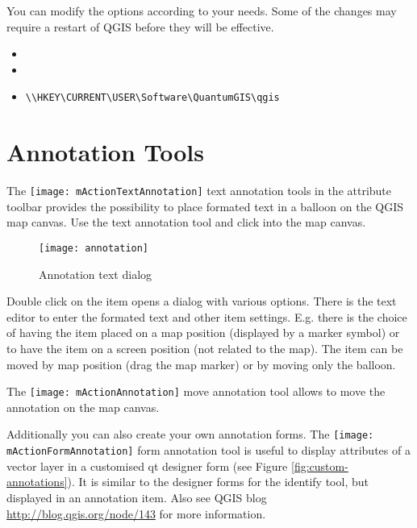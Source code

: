 You can modify the options according to your needs. Some of the changes may 
require a restart of QGIS before they will be effective.

\begin{itemize}
\item {}
\item {}
\item {}
\begin{verbatim}
\\HKEY\CURRENT\USER\Software\QuantumGIS\qgis
\end{verbatim}
\end{itemize}

\section{Annotation Tools}\label{sec:annotations}

The \texttt{[image: mActionTextAnnotation]} text 
annotation tools in the attribute toolbar provides the possibility to 
place formated text in a balloon on the QGIS map canvas. Use the text 
annotation tool and click into the map canvas. 

\begin{figure}[ht]
   \centering
   \texttt{[image: annotation]}
   \caption{Annotation text dialog \nixcaption}
   \label{fig:annotation}
\end{figure}

Double click on the item opens a dialog with various options. There is the 
text editor to enter the formated text and other item settings. E.g. there 
is the choice of having the item placed on a map position (displayed by 
a marker symbol) or to have the item on a screen position (not related 
to the map). The item can be moved by map position (drag the map marker) 
or by moving only the balloon.

The \texttt{[image: mActionAnnotation]} move annotation 
tool allows to move the annotation on the map canvas.  


Additionally you can also create your own annotation forms. The 
\texttt{[image: mActionFormAnnotation]} form annotation 
tool is useful to display attributes of a vector layer in a customised qt 
designer form (see Figure \ref{fig:custom-annotations}). It is similar to the 
designer forms for the identify tool, but displayed in an annotation item. 
Also see QGIS blog \url{http://blog.qgis.org/node/143} for more information.

